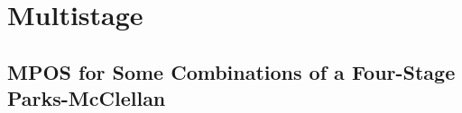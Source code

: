 
\chapter{Multistage} %

\label{AppendixA} %

\section{MPOS for Some Combinations of a Four-Stage Parks-McClellan}

\begin{table}[ht]
	\centering
	\begin{tabular}{|l||*{5}{c|}}\hline
		

\end{tabular}
\end{table}
